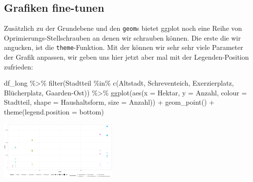 \documentclass[
]{book}
\newenvironment{Shaded}{\begin{snugshade}}{\end{snugshade}}
\newcommand{\AttributeTok}[1]{\textcolor[rgb]{0.77,0.63,0.00}{#1}}
\newcommand{\FunctionTok}[1]{\textcolor[rgb]{0.00,0.00,0.00}{#1}}
\newcommand{\NormalTok}[1]{#1}
\newcommand{\SpecialCharTok}[1]{\textcolor[rgb]{0.00,0.00,0.00}{#1}}
\newcommand{\StringTok}[1]{\textcolor[rgb]{0.31,0.60,0.02}{#1}}
\begin{document}
\hypertarget{grafiken-fine-tunen}{%
\subsection{Grafiken fine-tunen}\label{grafiken-fine-tunen}}

Zusätzlich zu der Grundebene und den \texttt{geom}s bietet ggplot noch eine Reihe von Oprimierungs-Stellschrauben an denen wir schrauben können. Die erste die wir angucken, ist die \texttt{theme}-Funktion. Mit der können wir sehr sehr viele Parameter der Grafik anpassen, wir geben uns hier jetzt aber mal mit der Legenden-Position zufrieden:

\begin{Shaded}
\begin{Highlighting}[]
\NormalTok{df\_long }\SpecialCharTok{\%\textgreater{}\%} 
  \FunctionTok{filter}\NormalTok{(Stadtteil }\SpecialCharTok{\%in\%} \FunctionTok{c}\NormalTok{(}\StringTok{\textquotesingle{}Altstadt\textquotesingle{}}\NormalTok{, }
                          \StringTok{\textquotesingle{}Schreventeich\textquotesingle{}}\NormalTok{, }
                          \StringTok{\textquotesingle{}Exerzierplatz\textquotesingle{}}\NormalTok{, }
                          \StringTok{\textquotesingle{}Blücherplatz\textquotesingle{}}\NormalTok{,}
                          \StringTok{\textquotesingle{}Gaarden{-}Ost\textquotesingle{}}\NormalTok{)) }\SpecialCharTok{\%\textgreater{}\%} 
  \FunctionTok{ggplot}\NormalTok{(}\FunctionTok{aes}\NormalTok{(}\AttributeTok{x =}\NormalTok{ Hektar,}
             \AttributeTok{y =}\NormalTok{ Anzahl,}
             \AttributeTok{colour =}\NormalTok{ Stadtteil,}
             \AttributeTok{shape =}\NormalTok{ Haushaltsform,}
             \AttributeTok{size =}\NormalTok{ Anzahl)) }\SpecialCharTok{+}
  \FunctionTok{geom\_point}\NormalTok{() }\SpecialCharTok{+}
  \FunctionTok{theme}\NormalTok{(}\AttributeTok{legend.position =} \StringTok{\textquotesingle{}bottom\textquotesingle{}}\NormalTok{)}
\end{Highlighting}
\end{Shaded}

\begin{center}\includegraphics[width=166.666666666667pt]{imgs/point_aes2} \end{center}
\end{document}
